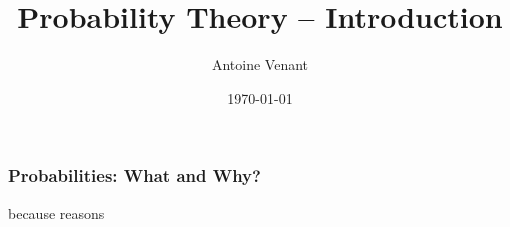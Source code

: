 \documentclass{beamer}
\begin{document}
\title{Probability Theory -- Introduction} 
\author{Antoine Venant}
\date{\today}
\maketitle


\begin{frame}
  \frametitle{Probabilities: What and Why?}
  because reasons
  
\end{frame}
\end{document}
